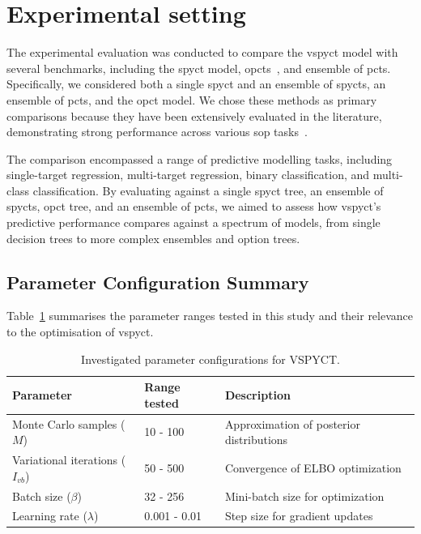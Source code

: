 \documentclass[3p,review,authoryear]{elsarticle}
\begin{document}
\section{Experimental setting}

The experimental evaluation was conducted to compare the \gls{vspyct} model with several benchmarks, including the \gls{spyct} model, \glspl{opct}~\citep{Stepisnik_2020}, and ensemble of \glspl{pct}.
Specifically, we considered both a single \gls{spyct} and an ensemble of \glspl{spyct}, an ensemble of \glspl{pct}, and the \gls{opct} model.
We chose these methods as primary comparisons because they have been extensively evaluated in the literature, demonstrating strong performance across various \gls{sop} tasks~\citep{Andonovikj_2024, Stepi_nik_2021}.

The comparison encompassed a range of predictive modelling tasks, including single-target regression, multi-target regression, binary classification, and multi-class classification.
By evaluating against a single \gls{spyct} tree, an ensemble of \glspl{spyct}, \gls{opct} tree, and an ensemble of \glspl{pct}, we aimed to assess how \gls{vspyct}'s predictive performance compares against a spectrum of models, from single decision trees to more complex ensembles and option trees.

\subsection{Parameter Configuration Summary}

Table~\ref{tab:parameter_ranges} summarises the parameter ranges tested in this study and their relevance to the optimisation of \gls{vspyct}.

\begin{table}[htbp]
\centering
\begin{tabular}{lll}
Parameter & Range tested & Description \\ \hline
Monte Carlo samples ($M$) & 10 - 100 & Approximation of posterior distributions \\
Variational iterations ($I_{vb}$) & 50 - 500 & Convergence of ELBO optimization \\
Batch size ($\beta$) & 32 - 256 & Mini-batch size for optimization \\
Learning rate ($\lambda$) & 0.001 - 0.01 & Step size for gradient updates \\
\end{tabular}
\caption{Investigated parameter configurations for VSPYCT.}
\label{tab:parameter_ranges}
\end{table}
\end{document}
